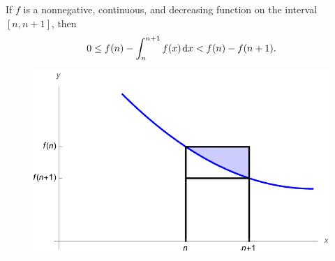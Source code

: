 \setcounter{chapter}{10}
\setcounter{section}{3}
\setcounter{theorem}{0}
\setcounter{equation}{0}


\begin{lemma}
If $f$ is a nonnegative, continuous, and decreasing function on the interval $[n, n+1]$, then
\begin{equation*}
0\le f(n) - \int_n^{n+1}f(x)\mkern 2mu \mathrm{d} x < f(n) - f(n+1).
\end{equation*}
\end{lemma}

\begin{figure}[h]
\includegraphics[width=5in]{img/series_integral_diff}
\end{figure}

\newpage

